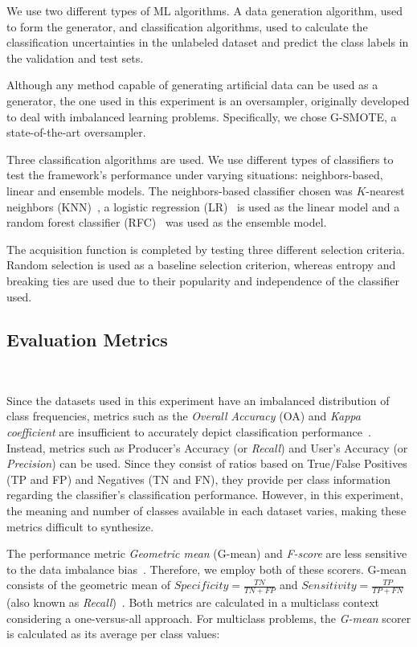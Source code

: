 We use two different types of ML algorithms. A data generation algorithm, used
to form the generator, and classification algorithms, used to calculate the
classification uncertainties in the unlabeled dataset and predict the class
labels in the validation and test sets.

Although any method capable of generating artificial data can be used as a
generator, the one used in this experiment is an oversampler, originally
developed to deal with imbalanced learning problems. Specifically, we chose
G-SMOTE, a state-of-the-art oversampler.

Three classification algorithms are used. We use different types of
classifiers to test the framework's performance under varying situations:
neighbors-based, linear and ensemble models. The neighbors-based classifier
chosen was $K$-nearest neighbors (KNN)~\cite{Cover1967}, a logistic regression
(LR)~\cite{Nelder1972} is used as the linear model and a random forest
classifier (RFC)~\cite{Ho1995} was used as the ensemble model.

The acquisition function is completed by testing three different selection
criteria. Random selection is used as a baseline selection criterion, whereas
entropy and breaking ties are used due to their popularity and independence of
the classifier used.

\subsection{Evaluation Metrics}~\label{sec:evaluation_metrics-al-generator}

Since the datasets used in this experiment have an imbalanced distribution of
class frequencies, metrics such as the \textit{Overall Accuracy} (OA) and
\textit{Kappa coefficient} are insufficient to accurately depict
classification performance~\cite{Olofsson2013, Pontius2011}. Instead, metrics
such as Producer's Accuracy (or \textit{Recall}) and User's Accuracy (or
\textit{Precision}) can be used. Since they consist of ratios based on
True/False Positives (TP and FP) and Negatives (TN and FN), they provide per
class information regarding the classifier's classification performance.
However, in this experiment, the meaning and number of classes available in
each dataset varies, making these metrics difficult to synthesize.

The performance metric \textit{Geometric mean} (G-mean) and
\textit{F-score} are less sensitive to the data imbalance
bias~\cite{Jeni2013, Kubat1997}.  Therefore, we employ both of these
scorers. G-mean consists of the geometric mean of $Specificity = \frac{TN}{TN
+ FP}$ and $Sensitivity = \frac{TP}{TP+FN}$ (also known as
\textit{Recall})~\cite{Kubat1997}. Both metrics are calculated in a multiclass
context considering a one-versus-all approach. For multiclass problems, the
\textit{G-mean} scorer is calculated as its average per class values: 
        
